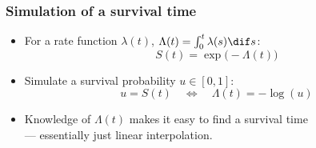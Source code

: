 \begin{frame}
   \frametitle{Simulation of a survival time}
   \begin{itemize}[<+->]
   \item For a rate function $\lambda(t)$,
     $\Lambda(t)=\int_0^t\lambda(s) \dif s$:
\[
   S(t) = \exp\bigl( -\Lambda(t) \bigr)
\]
   \item Simulate a survival probability $u \in [0,1]$:
\[
    u = S(t) \quad \Leftrightarrow \quad \Lambda(t) = -\log(u)
\]
   \item Knowledge of $\Lambda(t)$ makes it easy to find a survival time\\
      --- essentially just linear interpolation.
   \end{itemize}
\end{frame}





